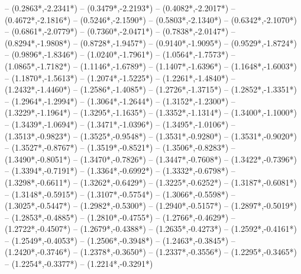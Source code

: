 {	-- ({0.2863*\dx},{-2.2341*\dy})
	-- ({0.3479*\dx},{-2.2193*\dy})
	-- ({0.4082*\dx},{-2.2017*\dy})
	-- ({0.4672*\dx},{-2.1816*\dy})
	-- ({0.5246*\dx},{-2.1590*\dy})
	-- ({0.5803*\dx},{-2.1340*\dy})
	-- ({0.6342*\dx},{-2.1070*\dy})
	-- ({0.6861*\dx},{-2.0779*\dy})
	-- ({0.7360*\dx},{-2.0471*\dy})
	-- ({0.7838*\dx},{-2.0147*\dy})
	-- ({0.8294*\dx},{-1.9808*\dy})
	-- ({0.8728*\dx},{-1.9457*\dy})
	-- ({0.9140*\dx},{-1.9095*\dy})
	-- ({0.9529*\dx},{-1.8724*\dy})
	-- ({0.9896*\dx},{-1.8346*\dy})
	-- ({1.0240*\dx},{-1.7961*\dy})
	-- ({1.0564*\dx},{-1.7573*\dy})
	-- ({1.0865*\dx},{-1.7182*\dy})
	-- ({1.1146*\dx},{-1.6789*\dy})
	-- ({1.1407*\dx},{-1.6396*\dy})
	-- ({1.1648*\dx},{-1.6003*\dy})
	-- ({1.1870*\dx},{-1.5613*\dy})
	-- ({1.2074*\dx},{-1.5225*\dy})
	-- ({1.2261*\dx},{-1.4840*\dy})
	-- ({1.2432*\dx},{-1.4460*\dy})
	-- ({1.2586*\dx},{-1.4085*\dy})
	-- ({1.2726*\dx},{-1.3715*\dy})
	-- ({1.2852*\dx},{-1.3351*\dy})
	-- ({1.2964*\dx},{-1.2994*\dy})
	-- ({1.3064*\dx},{-1.2644*\dy})
	-- ({1.3152*\dx},{-1.2300*\dy})
	-- ({1.3229*\dx},{-1.1964*\dy})
	-- ({1.3295*\dx},{-1.1635*\dy})
	-- ({1.3352*\dx},{-1.1314*\dy})
	-- ({1.3400*\dx},{-1.1000*\dy})
	-- ({1.3439*\dx},{-1.0694*\dy})
	-- ({1.3471*\dx},{-1.0396*\dy})
	-- ({1.3495*\dx},{-1.0106*\dy})
	-- ({1.3513*\dx},{-0.9823*\dy})
	-- ({1.3525*\dx},{-0.9548*\dy})
	-- ({1.3531*\dx},{-0.9280*\dy})
	-- ({1.3531*\dx},{-0.9020*\dy})
	-- ({1.3527*\dx},{-0.8767*\dy})
	-- ({1.3519*\dx},{-0.8521*\dy})
	-- ({1.3506*\dx},{-0.8283*\dy})
	-- ({1.3490*\dx},{-0.8051*\dy})
	-- ({1.3470*\dx},{-0.7826*\dy})
	-- ({1.3447*\dx},{-0.7608*\dy})
	-- ({1.3422*\dx},{-0.7396*\dy})
	-- ({1.3394*\dx},{-0.7191*\dy})
	-- ({1.3364*\dx},{-0.6992*\dy})
	-- ({1.3332*\dx},{-0.6798*\dy})
	-- ({1.3298*\dx},{-0.6611*\dy})
	-- ({1.3262*\dx},{-0.6429*\dy})
	-- ({1.3225*\dx},{-0.6252*\dy})
	-- ({1.3187*\dx},{-0.6081*\dy})
	-- ({1.3148*\dx},{-0.5915*\dy})
	-- ({1.3107*\dx},{-0.5754*\dy})
	-- ({1.3066*\dx},{-0.5598*\dy})
	-- ({1.3025*\dx},{-0.5447*\dy})
	-- ({1.2982*\dx},{-0.5300*\dy})
	-- ({1.2940*\dx},{-0.5157*\dy})
	-- ({1.2897*\dx},{-0.5019*\dy})
	-- ({1.2853*\dx},{-0.4885*\dy})
	-- ({1.2810*\dx},{-0.4755*\dy})
	-- ({1.2766*\dx},{-0.4629*\dy})
	-- ({1.2722*\dx},{-0.4507*\dy})
	-- ({1.2679*\dx},{-0.4388*\dy})
	-- ({1.2635*\dx},{-0.4273*\dy})
	-- ({1.2592*\dx},{-0.4161*\dy})
	-- ({1.2549*\dx},{-0.4053*\dy})
	-- ({1.2506*\dx},{-0.3948*\dy})
	-- ({1.2463*\dx},{-0.3845*\dy})
	-- ({1.2420*\dx},{-0.3746*\dy})
	-- ({1.2378*\dx},{-0.3650*\dy})
	-- ({1.2337*\dx},{-0.3556*\dy})
	-- ({1.2295*\dx},{-0.3465*\dy})
	-- ({1.2254*\dx},{-0.3377*\dy})
	-- ({1.2214*\dx},{-0.3291*\dy})
}
